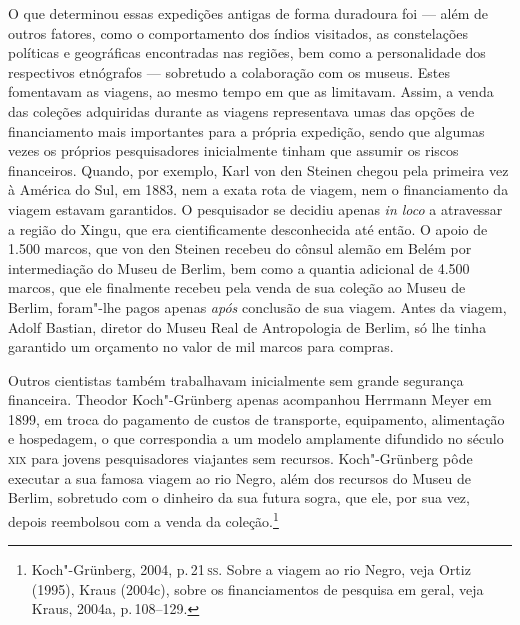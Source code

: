O que determinou essas expedições antigas de forma duradoura foi --- além
de outros fatores, como o comportamento dos índios visitados, as
constelações políticas e geográficas encontradas nas regiões, bem como
a personalidade dos respectivos etnógrafos --- sobretudo a colaboração
com os museus. Estes fomentavam as viagens, ao mesmo tempo em que as
limitavam. Assim, a venda das coleções adquiridas durante as viagens
representava umas das opções de financiamento mais importantes para a
própria expedição, sendo que algumas vezes os próprios pesquisadores
inicialmente tinham que assumir os riscos financeiros. Quando, por
exemplo, Karl von den Steinen chegou pela primeira vez à América do Sul,
em 1883, nem a exata rota de viagem, nem o financiamento da viagem
estavam garantidos. O pesquisador se decidiu apenas \textit{in loco} a
atravessar a região do Xingu, que era cientificamente desconhecida até
então. O apoio de 1.500 marcos, que von den Steinen recebeu do cônsul
alemão em Belém por intermediação do Museu de Berlim, bem como a quantia
adicional de 4.500 marcos, que ele finalmente recebeu pela venda de sua
coleção ao Museu de Berlim, foram"-lhe pagos apenas \textit{após}
conclusão de sua viagem. Antes da viagem, Adolf Bastian,
diretor do Museu Real de Antropologia de Berlim, só lhe tinha garantido
um orçamento no valor de mil marcos para compras.

Outros cientistas também trabalhavam inicialmente sem grande segurança
financeira. Theodor Koch"-Grünberg apenas acompanhou Herrmann Meyer em
1899, em troca do pagamento de custos de transporte, equipamento,
alimentação e hospedagem, o que correspondia a um modelo amplamente
difundido no século \textsc{xix} para jovens pesquisadores viajantes sem
recursos. Koch"-Grünberg pôde executar a sua famosa viagem ao rio Negro,
além dos recursos do Museu de Berlim, sobretudo com o dinheiro da sua
futura sogra, que ele, por sua vez, depois reembolsou com a venda da
coleção.\footnote{Koch"-Grünberg, 2004, p.\,21\,\textsc{ss}. Sobre a viagem ao rio
  Negro, veja Ortiz (1995), Kraus (2004c), sobre os financiamentos de
  pesquisa em geral, veja Kraus, 2004a, p.\,108--129.}


